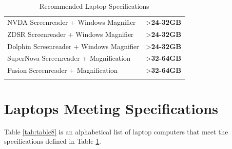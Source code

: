 \documentclass[14pt,letterpaper,twoside]{extreport}
\begin{document}
\begin{longtable}[]{@{}
	>{\raggedright\arraybackslash}m{}
	>{\raggedright\arraybackslash}b{}@{}
	}
	 NVDA Screenreader + Windows Magnifier  & \textgreater\textbf{24-32GB}        \\[1.5em]
         ZDSR Screenreader + Windows Magnifier  & \textgreater\textbf{24-32GB}        \\[1.5em]
         Dolphin Screenreader + Windows Magnifier  & \textgreater\textbf{24-32GB}        \\[1.5em]
	 SuperNova Screenreader + Magnification & \textgreater\textbf{32-64GB}        \\[1.5em]
	 Fusion Screenreader + Magnification    & \textgreater\textbf{32-64GB}        \\[1.5em] \hline
	\caption{Recommended Laptop Specifications}\label{tab:table7}
\end{longtable}

\pagebreak
	\hypertarget{laptops-meeting-recommended-specifications}{}\section{Laptops Meeting Specifications}\label{laptops-meeting-recommended-specifications}
Table \ref{tab:table8} is an alphabetical list of laptop computers that meet the specifications defined in Table \ref{tab:table7}.
\end{document}
